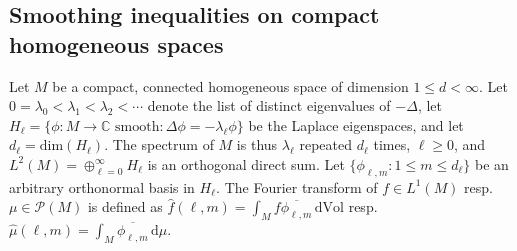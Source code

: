 \documentclass[11pt,a4paper]{article}
\theoremstyle{definition}
\begin{document}
\subsection{Smoothing inequalities on compact homogeneous spaces}\label{homogeneoussection}

Let $M$ be a compact, connected homogeneous space of dimension $1 \le d < \infty$. Let $0=\lambda_0<\lambda_1<\lambda_2< \cdots$ denote the list of distinct eigenvalues of $-\Delta$, let $H_{\ell}=\{ \phi: M \to \mathbb{C} \textrm{ smooth} : \Delta \phi = -\lambda_{\ell} \phi \}$ be the Laplace eigenspaces, and let $d_{\ell}=\mathrm{dim}(H_{\ell})$. The spectrum of $M$ is thus $\lambda_{\ell}$ repeated $d_{\ell}$ times, $\ell \ge 0$, and $L^2(M)=\oplus_{\ell=0}^{\infty} H_{\ell}$ is an orthogonal direct sum. Let $\{ \phi_{\ell,m} : 1 \le m \le d_{\ell} \}$ be an arbitrary orthonormal basis in $H_{\ell}$. The Fourier transform of $f \in L^1(M)$ resp.\ $\mu \in \mathcal{P}(M)$ is defined as $\widehat{f}(\ell,m)=\int_M f \overline{\phi_{\ell,m}} \, \mathrm{d} \mathrm{Vol}$ resp.\ $\widehat{\mu}(\ell,m)=\int_M \overline{\phi_{\ell,m}} \, \mathrm{d}\mu$.
\end{document}
